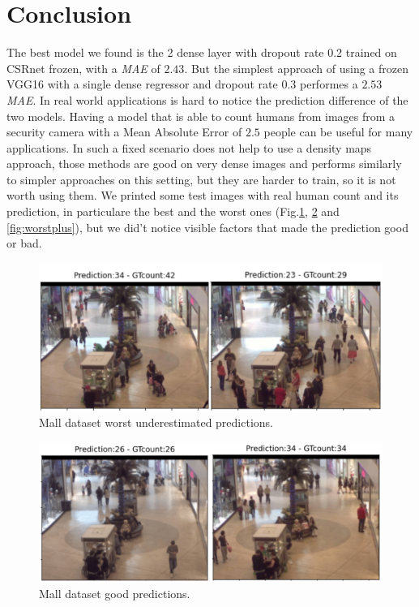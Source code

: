 \documentclass[10pt,twocolumn,letterpaper]{article}
\begin{document}
\section{Conclusion}
The best model we found is the 2 dense layer with dropout rate 0.2 trained on CSRnet frozen, with a \textit{MAE} of $2.43$. But the simplest approach of using a frozen VGG16 with a single dense regressor and dropout rate $0.3$ performes a $2.53$ \textit{MAE}. In real world applications is hard to notice the prediction difference of the two models. Having a model that is able to count humans from images from a security camera with a Mean Absolute Error of $2.5$ people can be useful for many applications. In such a fixed scenario does not help to use a density maps approach, those methods are good on very dense images and performs similarly to simpler approaches on this setting, but they are harder to train, so it is not worth using them. We printed some test images with real human count and its prediction, in particulare the best and the worst ones (Fig.\ref{fig:worst}, \ref{fig:best} and \ref{fig:worstplus}), but we did't notice visible factors that made the prediction good or bad. 

\begin{figure}[h!]%
	\includegraphics[width=1\columnwidth]{pics/low.png}
	\centering
	\caption{Mall dataset worst underestimated predictions.}
	\centering
	\label{fig:worst}
\end{figure}

\begin{figure}[h!]%
	\includegraphics[width=1\columnwidth]{pics/perfect.png}
	\centering
	\caption{Mall dataset good predictions.}
	\centering
	\label{fig:best}
\end{figure}
\end{document}

